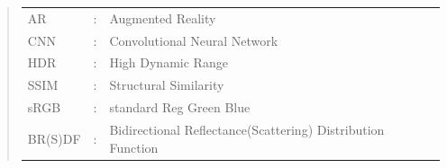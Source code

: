 \documentclass[ %
                    author={Gavin Parker},
                supervisor={Dr. Neill Campbell},
                    degree={MEng},
                     title={Deep Siamese Networks for Illumination Estimation from Stereo Images},
                  subtitle={},
                      type={research},
                      year={2018} ]{dissertation}
\begin{document}
\begin{quote}
\noindent
\begin{tabular}{lcl}
AR                 &:     & Augmented Reality                                         	\\
CNN                 &:     & Convolutional Neural Network                             	\\
HDR					&:		& High Dynamic Range										\\
SSIM				&:		& Structural Similarity										\\
sRGB				&:		& standard Reg Green Blue									\\
BR(S)DF				&:		& Bidirectional Reflectance(Scattering) Distribution Function
\end{tabular}
\end{quote}


\noindent


%

\mainmatter

\end{document}
